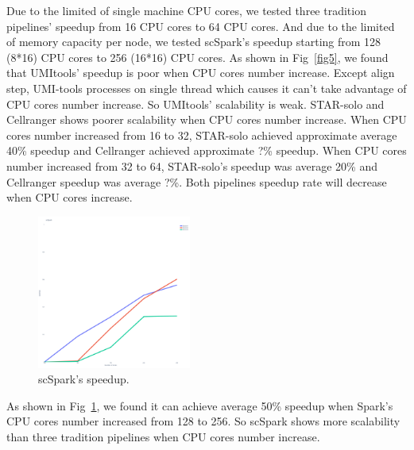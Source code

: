 \documentclass[conference]{IEEEtran}
\begin{document}
Due to the limited of single machine CPU cores, we tested three tradition pipelines' speedup from 16 CPU cores to 64 CPU cores.
And due to the limited of memory capacity per node, we tested scSpark's speedup starting from 128 (8*16) CPU cores to 256 (16*16) CPU cores.
As shown in Fig~\ref{fig5}, we found that UMI\-tools' speedup is poor when CPU cores number increase.
Except align step, UMI-tools processes on single thread which causes it can't take advantage of CPU cores number increase.
So UMI\-tools' scalability is weak.
STAR-solo and Cellranger shows poorer scalability when CPU cores number increase.
When CPU cores number increased from 16 to 32, STAR-solo achieved approximate average 40\% speedup and Cellranger achieved approximate ?\% speedup.
When CPU cores number increased from 32 to 64, STAR-solo's speedup was average 20\% and Cellranger speedup was average ?\%.
Both pipelines speedup rate will decrease when CPU cores increase.

\begin{figure}
	\includegraphics[width=0.45\textwidth]{fig7.pdf}
	\caption{scSpark's speedup.} \label{fig6}
\end{figure}
As shown in Fig~\ref{fig6}, we found it can achieve average 50\% speedup when Spark's CPU cores number increased from 128 to 256.
So scSpark shows more scalability than three tradition pipelines when CPU cores number increase.
\end{document}
